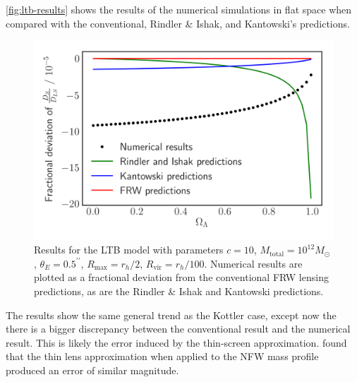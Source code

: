 \autoref{fig:ltb-results} shows the results of the numerical simulations in flat space when compared with the conventional, Rindler \& Ishak, and Kantowski's predictions. 

\begin{figure}
  \centering
  \includegraphics[height=0.5\linewidth]{images/ltb.png}
  \caption{Results for the LTB model with parameters $c = 10$, $M_{\text{total}} = 10^{12} M_\odot$, $\theta_E = 0.5^{\prime\prime}$, $R_{\text{max}} = r_h/2$, $R_{\text{vir}} = r_h/100$. Numerical results are plotted as a fractional deviation from the conventional FRW lensing predictions, as are the Rindler \& Ishak and Kantowski predictions. }
  \label{fig:ltb-results}
\end{figure}

The results show the same general trend as the Kottler case, except now the there is a bigger discrepancy between the conventional result and the numerical result. This is likely the error induced by the thin-screen approximation. \citet{frittelli2011accuracy} found that the thin lens approximation when applied to the NFW mass profile produced an error of similar magnitude. 